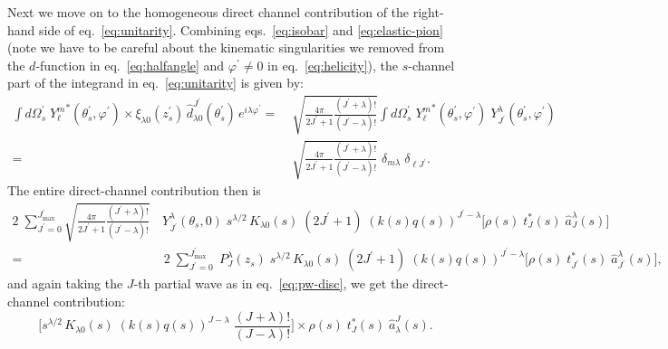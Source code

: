 \documentclass[10pt, aps,prd,amsmath,amssymb,superscriptaddress,onecolumn,
nofootinbib,showpacs,preprintnumbers]{revtex4-1}
\newcommand{\jpmax}{{J^\prime_\text{max}}}
\begin{document}
Next we move on to the homogeneous direct channel contribution of the right-hand side of eq.~\ref{eq:unitarity}. Combining eqs.~\ref{eq:isobar} and \ref{eq:elastic-pion} (note we have to be careful about the kinematic singularities we removed from the \(d\)-function in eq.~\ref{eq:halfangle} and \(\varphi^\prime \not= 0\) in eq.~\ref{eq:helicity}), the \(s\)-channel part of the integrand in eq.~\ref{eq:unitarity} is given by:
  \begin{align}
      \label{eq:direct-channel-angle}
     \int d\Omega_s^\prime \; {Y^m_\ell}^*(\theta_s^\prime, \varphi^\prime) \times \xi_{\lambda0}(z_s^\prime) \, \hat{d}_{\lambda0}^{J^\prime}(\theta_s^\prime) \, e^{i\lambda \varphi^\prime} =&
     \; \sqrt{\frac{4\pi}{2J^\prime+1}\frac{(J^\prime+\lambda)!}{(J^\prime-\lambda)!}} \int d\Omega_s^\prime \; {Y^m_\ell}^*(\theta_s^\prime, \varphi^\prime) \;  Y^\lambda_{J^\prime}(\theta_s^\prime, \varphi^\prime) \nonumber \\
    =& \;  \sqrt{\frac{4\pi}{2J^\prime+1}\frac{(J^\prime+\lambda)!}{(J^\prime-\lambda)!}} \;  \delta_{m\lambda} \; \delta_{\ell J^\prime}.
  \end{align}
The entire direct-channel contribution then is
  \begin{align}
    2 \; \sum_{J^\prime=0}^\jpmax \sqrt{\frac{4\pi}{2J^\prime+1}\frac{(J^\prime+\lambda)!}{(J^\prime-\lambda)!}}& \, {Y^\lambda_{J^\prime}}(\theta_s,0) \; s^{\lambda/2} \, K_{\lambda 0}(s) \; (2J^\prime +1) \; (k(s)q(s))^{J^\prime - \lambda}
    \bigg[\rho(s) \; t^*_J(s) \; \hat{a}^\lambda_J(s) \bigg ] \nonumber \\
    =& \;  2\;  \sum_{J^\prime=0}^\jpmax \; P^\lambda_J(z_s) \; s^{\lambda/2} \, K_{\lambda 0}(s) \; (2J^\prime +1) \; (k(s)q(s))^{J^\prime - \lambda}
    \bigg[\rho(s) \; t^*_{J^\prime}(s) \; \hat{a}^\lambda_{J^\prime}(s) \bigg ],
  \end{align}
and again taking the \(J\)-th partial wave as in eq.~\ref{eq:pw-disc}, we get the direct-channel contribution:
  \begin{equation}
    \label{eq:pw-direct}
   \bigg[ s^{\lambda/2} \, K_{\lambda 0}(s) \; (k(s)q(s))^{J - \lambda} \; \frac{(J+\lambda)!}{(J- \lambda)!} \bigg] \times \rho(s) \; t^*_J(s) \; \hat{a}_\lambda^J(s).
  \end{equation}
\end{document}
